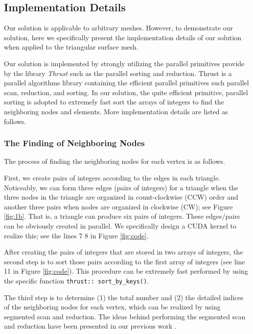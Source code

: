 \documentclass[twocolumn]{svjour3}          \smartqed  \usepackage{graphicx}
\begin{document}
\subsection{Implementation Details}

Our solution is applicable to arbitrary meshes. However, to demonstrate our 
solution, here we specifically present the implementation details of our 
solution when applied to the triangular surface mesh. 

Our solution is implemented by strongly utilizing the parallel primitives 
provide by the library \textit{Thrust} \cite{10_Bell2012359} such as the parallel sorting and 
reduction. Thrust is a parallel algorithms library containing the efficient 
parallel primitives such parallel scan, reduction, and sorting. In our 
solution, the quite efficient primitive, parallel sorting is adopted to 
extremely fast sort the arrays of integers to find the neighboring nodes and 
elements. More implementation details are listed as follows.

\subsubsection{The Finding of Neighboring Nodes}

The process of finding the neighboring nodes for each vertex is as follows.

First, we create pairs of integers according to the edges in each triangle. 
Noticeably, we can form three edges (pairs of integers) for a triangle when 
the three nodes in the triangle are organized in count-clockwise (CCW) order 
and another three pairs when nodes are organized in clockwise (CW); see 
Figure \ref{fig:1b}. That is, a triangle can produce six pairs of integers. These 
edges/pairs can be obviously created in parallel. We specifically design a 
CUDA kernel to realize this; see the lines 7  8 in Figure \ref{fig:code}.

After creating the pairs of integers that are stored in two arrays of 
integers, the second step is to sort those pairs according to the first 
array of integers (see line 11 in Figure \ref{fig:code}). This procedure can be 
extremely fast performed by using the specific function \texttt{thrust:: 
	sort{\_}by{\_}keys()}. 

The third step is to determine (1) the total number and (2) the 
detailed indices of the neighboring nodes for each vertex, which can be 
realized by using segmented scan and reduction. The ideas behind performing 
the segmented scan and reduction have been presented in our previous work \cite{11_Mei2016}.
\end{document}
